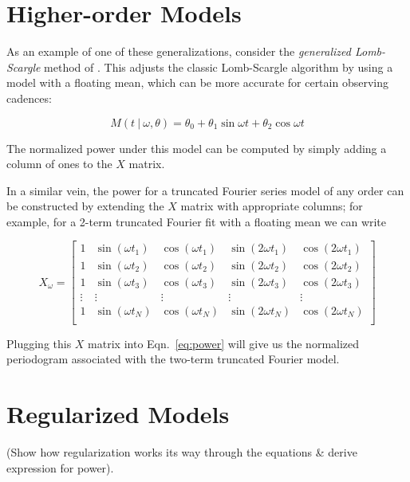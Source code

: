 \documentclass[12pt,preprint]{aastex}
\begin{document}
\section{Higher-order Models}

As an example of one of these generalizations, consider the {\it generalized Lomb-Scargle} method of \citep{Zechmeister09}. This adjusts the classic Lomb-Scargle algorithm by using a model with a floating mean, which can be more accurate for certain observing cadences:

\begin{equation}
  M(t~|~\omega, \theta) = \theta_0 + \theta_1\sin\omega t + \theta_2\cos\omega t
\end{equation}

The normalized power under this model can be computed by simply adding a column of ones to the $X$ matrix.

In a similar vein, the power for a truncated Fourier series model of any order can be constructed by extending the $X$ matrix with appropriate columns; for example, for a 2-term truncated Fourier fit with a floating mean we can write

\begin{equation}
X_\omega = \left[
\begin{array}{ccccc}
1 & \sin(\omega t_1) & \cos(\omega t_1) & \sin(2\omega t_1) & \cos(2\omega t_1)\\
1 & \sin(\omega t_2) & \cos(\omega t_2) & \sin(2\omega t_2) & \cos(2\omega t_2)\\
1 & \sin(\omega t_3) & \cos(\omega t_3) & \sin(2\omega t_3) & \cos(2\omega t_3)\\
\vdots & \vdots & \vdots & \vdots & \vdots \\
1 & \sin(\omega t_N) & \cos(\omega t_N) & \sin(2\omega t_N) & \cos(2\omega t_N)\\
\end{array}
\right]
\end{equation}

Plugging this $X$ matrix into Eqn.~\ref{eq:power} will give us the normalized periodogram associated with the two-term truncated Fourier model.

\section{Regularized Models}

(Show how regularization works its way through the equations \& derive expression for power).
\end{document}
